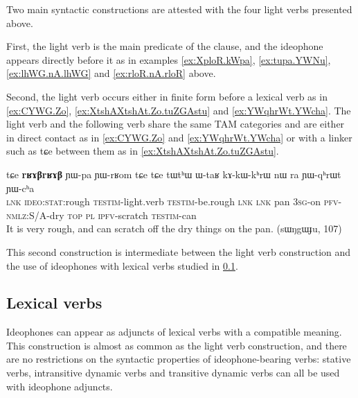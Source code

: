 \documentclass[oldfontcommands,oneside,a4paper,11pt]{article}
\newcommand{\ipa}[1]{{\phon \mbox{#1}}} %
\begin{document}
Two main syntactic constructions are attested with the four light verbs presented above.

First, the light verb is the main predicate of the clause, and the ideophone appears directly before it as in examples \ref{ex:XploR.kWpa}, \ref{ex:tupa.YWNu}, \ref{ex:lhWG.nA.lhWG} and \ref{ex:rloR.nA.rloR} above. 


Second, the light verb occurs either in finite   form before a lexical verb as in \ref{ex:CYWG.Zo}, \ref{ex:XtshAXtshAt.Zo.tuZGAstu}  and \ref{ex:YWqhrWt.YWcha}. The light verb and the following verb share the same TAM categories and are either in direct contact as in \ref{ex:CYWG.Zo} and \ref{ex:YWqhrWt.YWcha} or with a linker such as \ipa{tɕe} between them as in \ref{ex:XtshAXtshAt.Zo.tuZGAstu}.

\begin{exe}
\ex \label{ex:YWqhrWt.YWcha}
\gll
\ipa{tɕe} 	\ipa{\textbf{rʁɤβrʁɤβ}} 	\ipa{ɲɯ-pa} 	\ipa{ɲɯ-rʁom} 	\ipa{tɕe} 	\ipa{tɕe} 	\ipa{tɯtʰɯ} 	\ipa{ɯ-taʁ} 	\ipa{kɤ-kɯ-kʰrɯ} 	\ipa{nɯ} \ipa{ra} 	\ipa{ɲɯ-qʰrɯt} 	\ipa{ɲɯ-cʰa}       \\   
\textsc{lnk} \textsc{ideo:stat}:rough \textsc{testim}-light.verb \textsc{testim}-be.rough \textsc{lnk}  \textsc{lnk} pan \textsc{3sg}-on \textsc{pfv-nmlz}:S/A-dry \textsc{top} \textsc{pl} \textsc{ipfv}-scratch \textsc{testim}-can \\        
\glt  It is very rough, and can scratch off the dry things on the pan. (sɯŋgɯɟu, 107) 
\end{exe}
This second construction is intermediate between the light verb construction  and the use of ideophones with lexical verbs studied in \ref{sec:ideophone.plus.lexical.verb}.




\subsection{Lexical verbs} \label{sec:ideophone.plus.lexical.verb}
Ideophones can appear as adjuncts of   lexical verbs with a compatible meaning. This construction is almost as common as the light verb construction, and there are no restrictions on the syntactic properties of ideophone-bearing verbs: stative verbs, intransitive dynamic verbs and transitive dynamic verbs can all be used with ideophone adjuncts.
\end{document}
